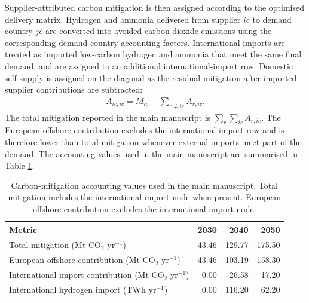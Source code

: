 \documentclass[sn-mathphys,Numbered]{sn-jnl}%
\theoremstyle{plain}%
\theoremstyle{definition}%
\theoremstyle{remark}%
\begin{document}
Supplier-attributed carbon mitigation is then assigned according to the optimised delivery matrix. Hydrogen and ammonia delivered from supplier $ic$ to demand country $jc$ are converted into avoided carbon dioxide emissions using the corresponding demand-country accounting factors. International imports are treated as imported low-carbon hydrogen and ammonia that meet the same final demand, and are assigned to an additional international-import row. Domestic self-supply is assigned on the diagonal as the residual mitigation after imported supplier contributions are subtracted:
\begin{align}
    A_{ic,ic} = M_{ic} - \sum_{r \neq ic} A_{r,ic}.
\end{align}
The total mitigation reported in the main manuscript is $\sum_r \sum_{ic} A_{r,ic}$. The European offshore contribution excludes the international-import row and is therefore lower than total mitigation whenever external imports meet part of the demand. The accounting values used in the main manuscript are summarised in Table \ref{tab carbon accounting summary}.

\begin{table}[tbp]
\centering
\caption{Carbon-mitigation accounting values used in the main manuscript. Total mitigation includes the international-import node when present. European offshore contribution excludes the international-import node.}
\label{tab carbon accounting summary}
\begin{tabular}{lrrr}
\hline
Metric & 2030 & 2040 & 2050 \\ \hline
Total mitigation (Mt CO$_2$ yr$^{-1}$) & 43.46 & 129.77 & 175.50 \\
European offshore contribution (Mt CO$_2$ yr$^{-1}$) & 43.46 & 103.19 & 158.30 \\
International-import contribution (Mt CO$_2$ yr$^{-1}$) & 0.00 & 26.58 & 17.20 \\
International hydrogen import (TWh yr$^{-1}$) & 0.00 & 116.20 & 62.20 \\ \hline
\end{tabular}
\end{table}






\end{document}
